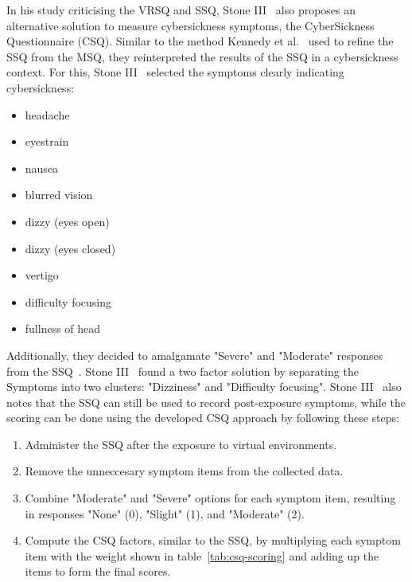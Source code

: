 In his study criticising the VRSQ and SSQ, Stone III~\cite{Stone2017} also proposes an alternative solution to
measure cybersickness symptoms, the CyberSickness Questionnaire (CSQ).
Similar to the method Kennedy et al.~\cite{Kennedy1993} used to refine the SSQ from the MSQ, they reinterpreted the
results of the SSQ in a cybersickness context.
For this, Stone III~\cite{Stone2017} selected the symptoms clearly indicating cybersickness:
\begin{itemize}
    \item headache
    \item eyestrain
    \item nausea
    \item blurred vision
    \item dizzy (eyes open)
    \item dizzy (eyes closed)
    \item vertigo
    \item difficulty focusing
    \item fullness of head
\end{itemize}
Additionally, they decided to amalgamate "Severe" and "Moderate" responses from the SSQ~\cite{Stone2017}.
Stone III~\cite{Stone2017} found a two factor solution by separating the Symptoms into two clusters: "Dizziness" and
"Difficulty focusing".
Stone III~\cite{Stone2017} also notes that the SSQ can still be used to record post-exposure symptoms, while the
scoring can be done using the developed CSQ approach by following these steps:
\begin{enumerate}
    \item Administer the SSQ after the exposure to virtual environments.
    \item Remove the unneccesary symptom items from the collected data.
    \item Combine "Moderate" and "Severe" options for each symptom item, resulting in responses "None" (0), "Slight"
    (1), and "Moderate" (2).
    \item Compute the CSQ factors, similar to the SSQ, by multiplying each symptom item with the weight shown in
    table~\ref{tab:csq-scoring} and adding up the items to form the final scores.
\end{enumerate}
